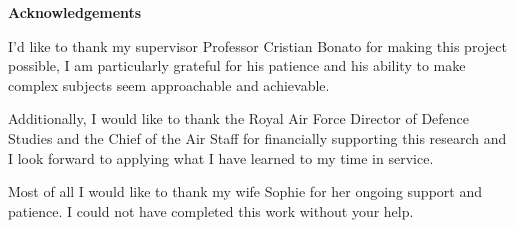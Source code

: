 \begin{center}
\textbf{Acknowledgements}
\end{center}
%
%
I'd like to thank my supervisor Professor Cristian Bonato for
making this project possible, I am particularly grateful for his
patience and his ability to make complex subjects seem approachable and achievable. 

\bigskip 

Additionally, I would like to thank the Royal Air Force Director of Defence Studies and the Chief of the Air Staff 
for financially supporting this research and I look forward to applying what I have learned to my time in service. 


\bigskip 

Most of all I would like to thank my wife Sophie for her ongoing support and patience. I could not have completed this work without your help. 

%
%
%
%
%


